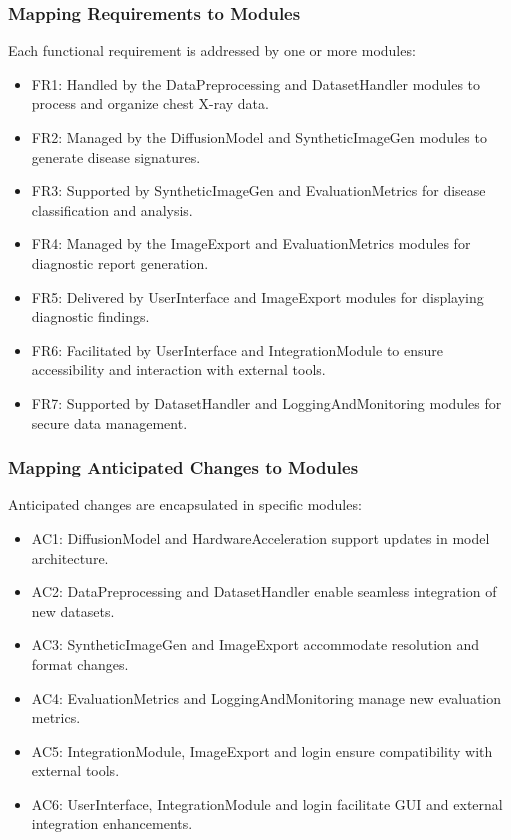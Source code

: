 \documentclass[12pt, titlepage]{article}
\begin{document}
\subsubsection{Mapping Requirements to Modules}
Each functional requirement is addressed by one or more modules:
\begin{itemize}
\item FR1: Handled by the DataPreprocessing and DatasetHandler modules to process and organize chest X-ray data.
\item FR2: Managed by the DiffusionModel and SyntheticImageGen modules to generate disease signatures.
\item FR3: Supported by SyntheticImageGen and EvaluationMetrics for disease classification and analysis.
\item FR4: Managed by the ImageExport and EvaluationMetrics modules for diagnostic report generation.
\item FR5: Delivered by UserInterface and ImageExport modules for displaying diagnostic findings.
\item FR6: Facilitated by UserInterface and IntegrationModule to ensure accessibility and interaction with external tools.
\item FR7: Supported by DatasetHandler and LoggingAndMonitoring modules for secure data management.
\end{itemize}
\subsubsection{Mapping Anticipated Changes to Modules}
Anticipated changes are encapsulated in specific modules:
\begin{itemize}
\item AC1: DiffusionModel and HardwareAcceleration support updates in model architecture.
\item AC2: DataPreprocessing and DatasetHandler enable seamless integration of new datasets.
\item AC3: SyntheticImageGen and ImageExport accommodate resolution and format changes.
\item AC4: EvaluationMetrics and LoggingAndMonitoring manage new evaluation metrics.
\item AC5: IntegrationModule, ImageExport and login ensure compatibility with external tools.
\item AC6: UserInterface, IntegrationModule and login facilitate GUI and external integration enhancements.
\end{itemize}
\end{document}
